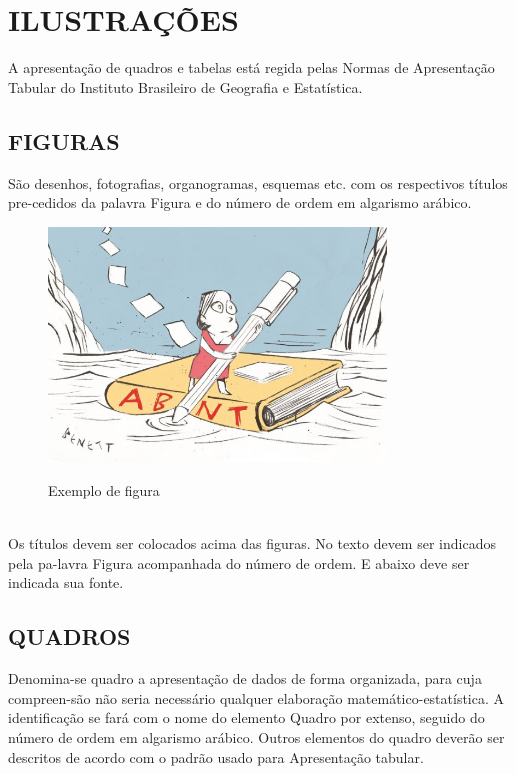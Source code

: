 %
%

\chapter{ILUSTRAÇÕES}

A apresentação de quadros e tabelas está regida pelas Normas de Apresentação Tabular do Instituto Brasileiro de Geografia e Estatística.

\section{FIGURAS}

São desenhos, fotografias, organogramas, esquemas etc. com os respectivos títulos pre-cedidos da palavra Figura e do número de ordem em algarismo arábico.

\begin{figure}[H]
    \centering
    \caption{Exemplo de figura}
	\vspace*{0,2cm}
    \includegraphics[width=0.8\textwidth]{./04-figuras/navegar_abnt}
    \label{fig:ilustfig}
\end{figure}
\vspace*{-0,9cm}
{\raggedright {}}\\

Os títulos devem ser colocados acima das figuras. No texto devem
ser indicados pela pa-lavra Figura acompanhada do número de ordem. E abaixo deve ser indicada sua fonte.

\section{QUADROS}

Denomina-se quadro a apresentação de dados de forma organizada, para cuja compreen-são não seria necessário qualquer elaboração matemático-estatística. A identificação se fará com o nome do elemento Quadro por extenso, seguido do número de ordem em algarismo arábico. Outros elementos do quadro deverão ser descritos de acordo com o padrão usado para
Apresentação tabular.

